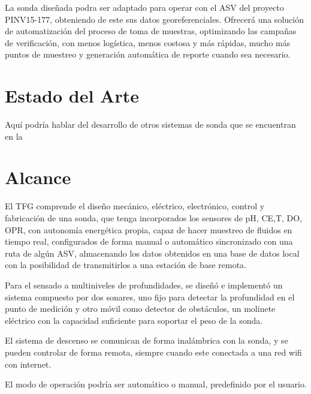 La sonda diseñada podra ser adaptado para operar con el ASV del proyecto PINV15-177, obteniendo de este sus datos georeferenciales.
Ofrecer\'a una solución de automatizaci\'on del proceso de toma de muestras, optimizando  las campañas de verificaci\'on, con menos log\'istica, menos costosa y m\'as r\'apidas,  mucho m\'as puntos de muestreo y generaci\'on autom\'atica de reporte cuando sea necesario.


\section{Estado del Arte}
Aqu\'i podría hablar del desarrollo de otros sistemas de sonda que se encuentran en la

\section{Alcance}
El TFG comprende el diseño mecánico, eléctrico, electrónico, control y fabricación de una sonda, que tenga incorporados los sensores de pH, CE,T, DO, OPR, con autonomía energética propia, capaz de hacer muestreo de fluidos en tiempo real, configurados de forma manual o automático sincronizado con una ruta de algún ASV, almacenando los datos obtenidos en una base de datos local con la posibilidad de transmitirlos a una estación de base remota. 

Para el sensado a multiniveles de profundidades, se diseñó e implementó un sistema compuesto por dos sonares, uno fijo para detectar la profundidad en el punto de medición y otro móvil como detector de obstáculos, un molinete eléctrico con la capacidad suficiente para soportar el peso de la sonda.

El sistema de descenso se comunican de forma inalámbrica con la sonda, y se pueden controlar de forma remota, siempre cuando este conectada a una red wifi con internet.

El modo de operación podría ser automático o manual, predefinido por el usuario.





